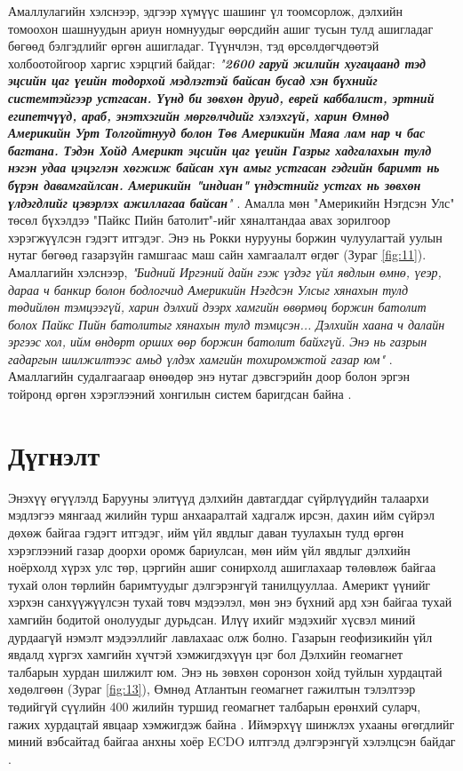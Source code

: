 \documentclass[10pt,twocolumn,letterpaper]{article}
\begin{document}
Амаллулагийн хэлснээр, эдгээр хүмүүс шашинг үл тоомсорлож, дэлхийн томоохон шашнуудын ариун номнуудыг өөрсдийн ашиг тусын тулд ашигладаг бөгөөд бэлгэдлийг өргөн ашигладаг. Түүнчлэн, тэд өрсөлдөгчдөөтэй холбоотойгоор харгис хэрцгий байдаг: \textit{"\textbf{2600 гаруй жилийн хугацаанд тэд эцсийн цаг үеийн тодорхой мэдлэгтэй байсан бусад хэн бүхнийг системтэйгээр устгасан. Үүнд би зөвхөн друид, еврей каббалист, эртний египетчүүд, араб, энэтхэгийн мөргөлчдийг хэлэхгүй, харин Өмнөд Америкийн Урт Толгойтнууд болон Төв Америкийн Маяа лам нар ч бас багтана. Тэдэн Хойд Америкт эцсийн цаг үеийн Газрыг хадгалахын тулд нэгэн удаа цэцэглэн хөгжиж байсан хүн амыг устгасан гэдгийн баримт нь бүрэн давамгайлсан. Америкийн "индиан" үндэстнийг устгах нь зөвхөн үлдэгдлийг цэвэрлэх ажиллагаа байсан}"} \cite{33,34}.
Амалла мөн "Америкийн Нэгдсэн Улс" төсөл бүхэлдээ "Пайкс Пийн батолит"-ийг хяналтандаа авах зорилгоор хэрэгжүүлсэн гэдэгт итгэдэг. Энэ нь Рокки нурууны боржин чулуулагтай уулын нутаг бөгөөд газарзүйн гамшгаас маш сайн хамгаалалт өгдөг (Зураг \ref{fig:11}). Амаллагийн хэлснээр, \textit{"Бидний Иргэний дайн гэж үздэг үйл явдлын өмнө, үеэр, дараа ч банкир болон бодлогчид Америкийн Нэгдсэн Улсыг хянахын тулд төдийлөн тэмцээгүй, харин дэлхий дээрх хамгийн өвөрмөц боржин батолит болох Пайкс Пийн батолитыг хянахын тулд тэмцсэн... Дэлхийн хаана ч далайн эргээс хол, ийм өндөрт орших өөр боржин батолит байхгүй. Энэ нь газрын гадаргын шилжилтээс амьд үлдэх хамгийн тохиромжтой газар юм"} \cite{33,34}. Амаллагийн судалгаагаар өнөөдөр энэ нутаг дэвсгэрийн доор болон эргэн тойронд өргөн хэрэглээний хонгилын систем баригдсан байна \cite{36}.

\section{Дүгнэлт}

Энэхүү өгүүлэлд Барууны элитүүд дэлхийн давтагддаг сүйрлүүдийн талаархи мэдлэгээ мянгаад жилийн турш анхааралтай хадгалж ирсэн, дахин ийм сүйрэл дөхөж байгаа гэдэгт итгэдэг, ийм үйл явдлыг даван туулахын тулд өргөн хэрэглээний газар доорхи оромж бариулсан, мөн ийм үйл явдлыг дэлхийн ноёрхолд хүрэх улс төр, цэргийн ашиг сонирхолд ашиглахаар төлөвлөж байгаа тухай олон төрлийн баримтуудыг дэлгэрэнгүй танилцууллаа. Америкт үүнийг хэрхэн санхүүжүүлсэн тухай товч мэдээлэл, мөн энэ бүхний ард хэн байгаа тухай хамгийн бодитой онолуудыг дурьдсан. Илүү ихийг мэдэхийг хүсвэл миний дурдаагүй нэмэлт мэдээллийг лавлахаас олж болно.
Газарын геофизикийн үйл явдалд хүргэх хамгийн хүчтэй хэмжигдэхүүн цэг бол Дэлхийн геомагнет талбарын хурдан шилжилт юм. Энэ нь зөвхөн соронзон хойд туйлын хурдацтай хөдөлгөөн (Зураг \ref{fig:13}), Өмнөд Атлантын геомагнет гажилтын тэлэлтээр төдийгүй сүүлийн 400 жилийн туршид геомагнет талбарын ерөнхий суларч, гажих хурдацтай явцаар хэмжигдэж байна \cite{3}. Иймэрхүү шинжлэх ухааны өгөгдлийг миний вэбсайтад байгаа анхны хоёр ECDO илтгэлд дэлгэрэнгүй хэлэлцсэн байдаг \cite{3}.
\end{document}
